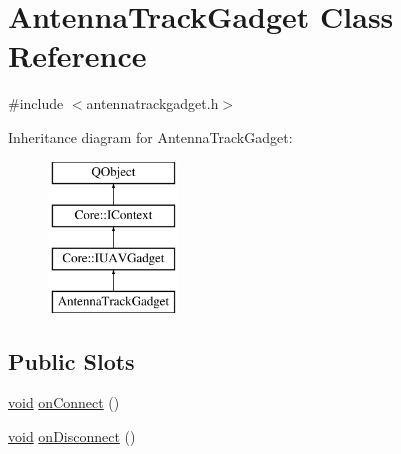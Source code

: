 \hypertarget{class_antenna_track_gadget}{\section{Antenna\-Track\-Gadget Class Reference}
\label{class_antenna_track_gadget}
}


{\ttfamily \#include $<$antennatrackgadget.\-h$>$}

Inheritance diagram for Antenna\-Track\-Gadget\-:\begin{figure}[H]
\begin{center}
\leavevmode
\includegraphics[height=4.000000cm]{class_antenna_track_gadget}
\end{center}
\end{figure}
\subsection*{Public Slots}
\begin{DoxyCompactItemize}
\item 
\hyperlink{group___u_a_v_objects_plugin_ga444cf2ff3f0ecbe028adce838d373f5c}{void} \hyperlink{group___antenna_track_gadget_plugin_ga900506724dae73384f80ed883f037588}{on\-Connect} ()
\item 
\hyperlink{group___u_a_v_objects_plugin_ga444cf2ff3f0ecbe028adce838d373f5c}{void} \hyperlink{group___antenna_track_gadget_plugin_ga2732f0141e7e02dc548535a3a87965a6}{on\-Disconnect} ()
\end{DoxyCompactItemize}
